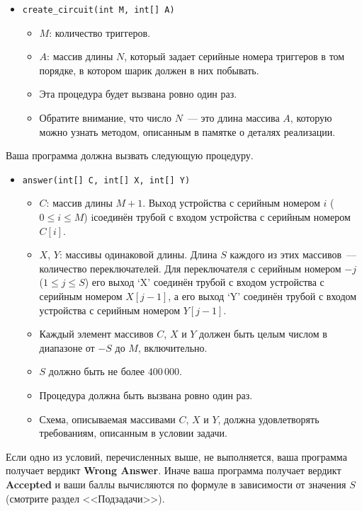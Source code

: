 \begin{itemize}
    \item \texttt{create\_circuit(int M, int[] A)}
    \begin{itemize}
        \item $M$: количество триггеров.
        \item $A$: массив длины $N$, который задает серийные номера триггеров в том
порядке, в котором шарик должен в них побывать.
        \item Эта процедура будет вызвана ровно один раз.
        \item Обратите внимание, что число $N$~--- это длина массива $A$, которую можно
узнать методом, описанным в памятке о деталях реализации.
    \end{itemize}
\end{itemize}
Ваша программа должна вызвать следующую процедуру.
\begin{itemize}
\item \texttt{answer(int[] C, int[] X, int[] Y)}
\begin{itemize}
    \item $C$: массив длины $M+1$. Выход устройства с серийным номером $i$ ($0 \le i \le M$) iсоединён трубой с входом устройства с серийным номером $C[i]$.
    \item $X$, $Y$: массивы одинаковой длины. Длина $S$ каждого из этих массивов~---
количество переключателей. Для переключателя с серийным номером $-j$ ($1 \le j \le S$) его выход `X' соединён трубой с входом устройства с серийным
номером $X[j-1]$, а его выход `Y' соединён трубой с входом устройства с
серийным номером $Y[j-1]$.
    \item Каждый элемент массивов $C$, $X$ и $Y$ должен быть целым числом в диапазоне от $-S$
до $M$, включительно.
    \item $S$ должно быть не более $400\,000$.
    \item Процедура должна быть вызвана ровно один раз.
    \item Схема, описываемая массивами $C$, $X$ и $Y$, должна удовлетворять требованиям,
описанным в условии задачи.
\end{itemize}
\end{itemize}


Если одно из условий, перечисленных выше, не выполняется, ваша программа
получает вердикт \textbf{Wrong Answer}. Иначе ваша программа получает вердикт
\textbf{Accepted} и ваши баллы вычисляются по формуле в зависимости от значения $S$
(смотрите раздел <<Подзадачи>>).



